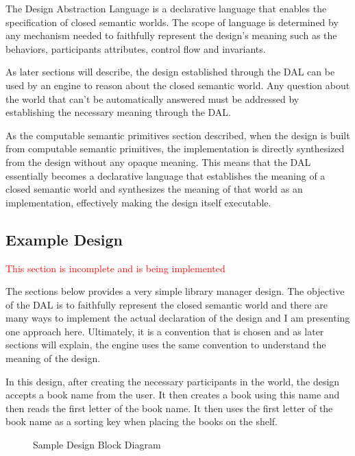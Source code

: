The Design Abstraction Language is a declarative language that enables the specification of closed semantic worlds. The scope of language is determined by any mechanism needed to faithfully represent the design's meaning such as the behaviors, participants attributes, control flow and invariants.

As later sections will describe, the design established through the DAL can be used by an engine to reason about the closed semantic world. Any question about the world that can’t be automatically answered must be addressed by establishing the necessary meaning through the DAL.

As the computable semantic primitives section described, when the design is built from computable semantic primitives, the implementation is directly synthesized from the design without any opaque meaning. This means that the DAL essentially becomes a declarative language that establishes the meaning of a closed semantic world and synthesizes the meaning of that world as an implementation, effectively making the design itself executable.

\subsection{Example Design}

\textcolor{red}{This section is incomplete and is being implemented}

The sections below provides a very simple library manager design. The objective of the DAL is to faithfully represent the closed semantic world and there are many ways to implement the actual declaration of the design and I am presenting one approach here. Ultimately, it is a convention that is chosen and as later sections will explain, the engine uses the same convention to understand the meaning of the design.

In this design, after creating the necessary participants in the world, the design accepts a book name from the user. It then creates a book using this name and then reads the first letter of the book name. It then uses the first letter of the book name as a sorting key when placing the books on the shelf.

\begin{figure}[htbp]
    
    \caption{Sample Design Block Diagram}
    \label{fig:sample_design_block_diagram}
\end{figure}


